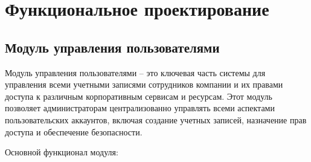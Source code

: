 \section{Функциональное проектирование}

\subsection{Модуль управления пользователями}
\label{sec:user_management_functionality}

Модуль управления пользователями -- это ключевая часть системы для управления всеми учетными записями сотрудников компании и их правами доступа к различным корпоративным сервисам и ресурсам. Этот модуль позволяет администраторам централизованно управлять всеми аспектами пользовательских аккаунтов, включая создание учетных записей, назначение прав доступа и обеспечение безопасности.

Основной функционал модуля:

